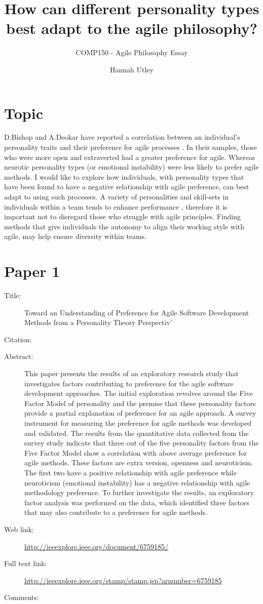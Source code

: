 \documentclass{scrartcl}
\title{How can different personality types best adapt to the agile philosophy?}
\subtitle{COMP150 - Agile Philosophy Essay}
\author{Hannah Utley}
\begin{document}
\maketitle

\section*{Topic}

D.Bishop and A.Deokar have reported a correlation between an individual’s personality traits and their preference for agile processes \cite{Paper1}. In their samples, those who were more open and extraverted had a greater preference for agile. Whereas neurotic personality types (or emotional instability) were less likely to prefer agile methods. I would like to explore how individuals, with personality types that have been found to have a negative relationship with agile preference, can best adapt to using such processes. A variety of personalities and skill-sets in individuals within a team tends to enhance performance \cite{Paper3}, therefore it is important not to disregard those who struggle with agile principles. Finding methods that give individuals the autonomy to align their working style with agile, may help ensure diversity within teams.

\section*{Paper 1}
\begin{description}
\item[Title:] Toward an Understanding of Preference for Agile Software Development Methods from a Personality Theory Perspectiv'
\item[Citation:] \cite{Paper1}
\item[Abstract:] This paper presents the results of an exploratory research study that investigates factors contributing to preference for the agile software development approaches. The initial exploration revolves around the Five Factor Model of personality and the premise that these personality factors provide a partial explanation of preference for an agile approach. A survey instrument for measuring the preference for agile methods was developed and validated. The results from the quantitative data collected from the survey study indicate that three out of the five personality factors from the Five Factor Model show a correlation with above average preference for agile methods. These factors are extra version, openness and neuroticism. The first two have a positive relationship with agile preference while neuroticism (emotional instability) has a negative relationship with agile methodology preference. To further investigate the results, an exploratory factor analysis was performed on the data, which identified three factors that may also contribute to a preference for agile methods.
\item[Web link:] \url{http://ieeexplore.ieee.org/document/6759185/}
\item[Full text link:] \url{http://ieeexplore.ieee.org/stamp/stamp.jsp?arnumber=6759185}
\item[Comments:] 
\end{description}
\end{document}
